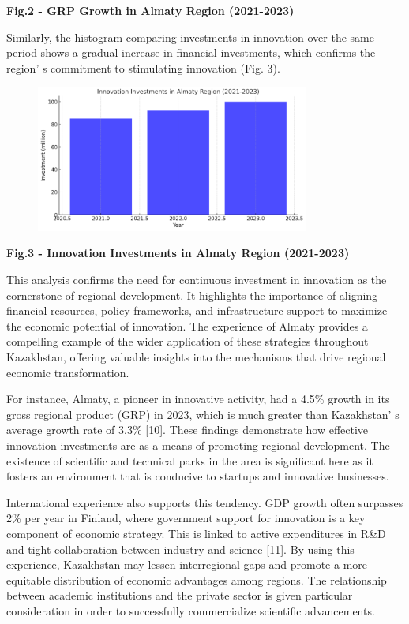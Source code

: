 {\bfseries Fig.2 - GRP Growth in Almaty Region (2021-2023)}

Similarly, the histogram comparing investments in innovation over the
same period shows a gradual increase in financial investments, which
confirms the region' s commitment to stimulating
innovation (Fig. 3).

\begin{figure}[H]
	\centering
	\includegraphics[width=0.8\textwidth]{media/ekon2/image5}
	\caption*{}
\end{figure}


{\bfseries Fig.3 - Innovation Investments in Almaty Region (2021-2023)}

This analysis confirms the need for continuous investment in innovation
as the cornerstone of regional development. It highlights the importance
of aligning financial resources, policy frameworks, and infrastructure
support to maximize the economic potential of innovation. The experience
of Almaty provides a compelling example of the wider application of
these strategies throughout Kazakhstan, offering valuable insights into
the mechanisms that drive regional economic transformation.

For instance, Almaty, a pioneer in innovative activity, had a 4.5\%
growth in its gross regional product (GRP) in 2023, which is much
greater than Kazakhstan' s average growth rate of 3.3\%
{[}10{]}. These findings demonstrate how effective innovation
investments are as a means of promoting regional development. The
existence of scientific and technical parks in the area is significant
here as it fosters an environment that is conducive to startups and
innovative businesses.

International experience also supports this tendency. GDP growth often
surpasses 2\% per year in Finland, where government support for
innovation is a key component of economic strategy. This is linked to
active expenditures in R\&D and tight collaboration between industry and
science {[}11{]}. By using this experience, Kazakhstan may lessen
interregional gaps and promote a more equitable distribution of economic
advantages among regions. The relationship between academic institutions
and the private sector is given particular consideration in order to
successfully commercialize scientific advancements.

